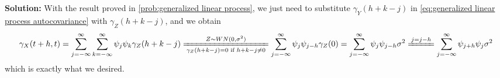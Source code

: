 \documentclass[11pt]{article}
\theoremstyle{plain} %
\newenvironment{solution}
{\color{C2}\normalfont\begin{framed}\begingroup\textbf{Solution:} }
  {\endgroup\end{framed}}
\theoremstyle{remark}
\begin{document}
\begin{solution}
	With the result proved in \cref{prob:generalized linear process}, we just need to  substitute $\gamma_{Y}(h+k-j)$ in \cref{eq:generalized linear process autocovariance} with $\gamma_{Z}(h+k-j)$, and we obtain
	$$
		\gamma_{X}(t+h,t) = \sum_{j=-\infty}^{\infty}\sum_{k=-\infty}^{\infty} \psi_{j} \psi_{k}\gamma_{Z}(h+k-j) \xlongequal[\gamma_{Z}(h+k-j)= 0 \text{ if } h+k-j \ne 0]{Z\sim WN(0, \sigma^{2})} \sum_{j=-\infty}^{\infty} \psi_{j} \psi_{j-h}\gamma_{Z}(0) = \sum_{j=-\infty}^{\infty} \psi_{j} \psi_{j-h}\sigma^{2} \xlongequal{j = j-h} \sum_{j=-\infty}^{\infty} \psi_{j+h} \psi_{j}\sigma^{2}
	$$
	which is exactly what we desired.
\end{solution}
\end{document}
